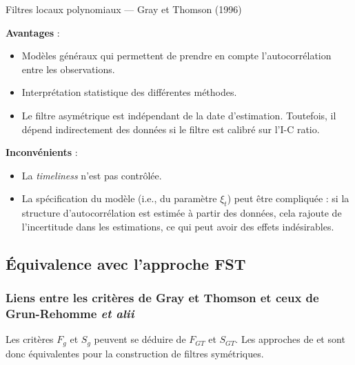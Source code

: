 \documentclass[
  11pt,
  french,
  a4paper]{article}
\newcommand\1{\mathds{1}}
\begin{document}
\begin{summary_box}{Filtres locaux polynomiaux --- Gray et Thomson (1996)}

\textbf{Avantages} :

\begin{itemize}
\item
  Modèles généraux qui permettent de prendre en compte l'autocorrélation entre les observations.
\item
  Interprétation statistique des différentes méthodes.
\item
  Le filtre asymétrique est indépendant de la date d'estimation.
  Toutefois, il dépend indirectement des données si le filtre est calibré sur l'I-C ratio.
\end{itemize}

\textbf{Inconvénients} :

\begin{itemize}
\item
  La \emph{timeliness} n'est pas contrôlée.
\item
  La spécification du modèle (i.e., du paramètre \(\xi_t\)) peut être compliquée : si la structure d'autocorrélation est estimée à partir des données, cela rajoute de l'incertitude dans les estimations, ce qui peut avoir des effets indésirables.
\end{itemize}

\end{summary_box}

\hypertarget{subsec-equivlpfst}{%
\subsection{Équivalence avec l'approche FST}\label{subsec-equivlpfst}}

\hypertarget{liens-entre-les-crituxe8res-de-gray-et-thomson-et-ceux-de-grun-rehomme-et-alii}{%
\subsubsection{\texorpdfstring{Liens entre les critères de Gray et Thomson et ceux de Grun-Rehomme \emph{et alii}}{Liens entre les critères de Gray et Thomson et ceux de Grun-Rehomme et alii}}\label{liens-entre-les-crituxe8res-de-gray-et-thomson-et-ceux-de-grun-rehomme-et-alii}}

Les critères \(F_g\) et \(S_g\) peuvent se déduire de \(F_{GT}\) et \(S_{GT}\).
Les approches de \textcite{GrayThomson1996} et \textcite{ch15HBSA} sont donc équivalentes pour la construction de filtres symétriques.
\end{document}
